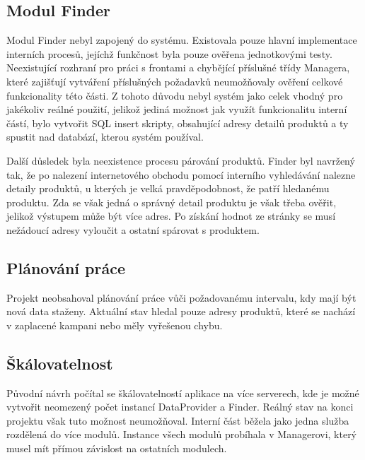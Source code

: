 \documentclass[thesis=B,czech]{FITthesis}[2012/06/26]
\begin{document}
\subsection{Modul Finder}
Modul Finder nebyl zapojený do systému. Existovala pouze hlavní implementace interních procesů, jejíchž funkčnost byla
pouze ověřena jednotkovými testy. Neexistující rozhraní pro práci s frontami a chybějící příslušné třídy Managera, které zajišťují vytváření příslušných požadavků neumožňovaly ověření celkové funkcionality této části. Z tohoto důvodu nebyl systém jako celek vhodný pro jakékoliv reálné použití, jelikož
jediná možnost jak využít funkcionalitu interní částí, bylo vytvořit SQL insert skripty, obsahující adresy detailů produktů
a ty spustit nad databází, kterou systém používal.
\par
Další důsledek byla neexistence procesu párování produktů. Finder byl navržený tak, že po nalezení internetového obchodu
pomocí interního vyhledávání nalezne detaily produktů, u kterých je velká pravděpodobnost, že patří hledanému produktu.
Zda se však jedná o správný detail produktu je však třeba ověřit, jelikož výstupem může být více adres. Po získání hodnot ze stránky se musí nežádoucí adresy vyloučit a ostatní spárovat s produktem.
\subsection{Plánování práce}
Projekt neobsahoval plánování práce vůči požadovanému intervalu, kdy mají být nová data
staženy. Aktuální stav hledal pouze adresy produktů, které se nachází v zaplacené kampani nebo měly vyřešenou chybu.
\subsection{Škálovatelnost}
Původní návrh počítal se škálovatelností aplikace na více serverech, kde je možné vytvořit neomezený počet instancí DataProvider a Finder. Reálný stav na konci projektu však tuto možnost neumožňoval. Interní část běžela jako jedna služba rozdělená do více modulů. 
Instance všech modulů probíhala v Managerovi, který musel mít přímou závislost na ostatních modulech.
\end{document}

